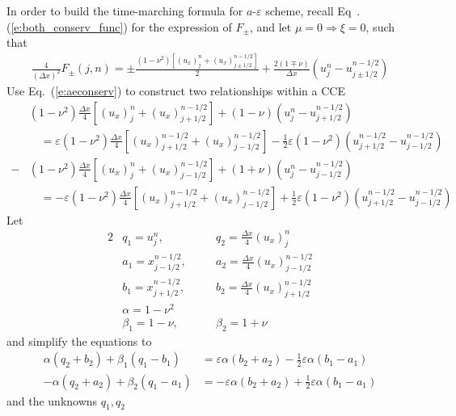 \documentclass{turgon}
\begin{document}
In order to build the time-marching formula for $a$-$\varepsilon$ scheme,
recall Eq~.(\ref{e:both_conserv_func}) for the expression of
$F_{\pm}$, and let $\mu=0\Rightarrow\xi=0$, such that
\begin{align*}
  \frac{4}{(\Delta x)^2}F_{\pm}(j,n)
    = \pm\frac{(1-\nu^2)[(u_x)_j^n+(u_x)_{j\pm1/2}^{n-1/2}]}{2}
    + \frac{2(1\mp\nu)}{\Delta x}(u_j^n-u_{j\pm1/2}^{n-1/2})
\end{align*}
Use Eq.~(\ref{e:aeconserv}) to construct two relationships within a CCE
\begin{align*}
  &(1-\nu^2)\frac{\Delta x}{4}[(u_x)_j^n+(u_x)_{j+1/2}^{n-1/2}]
    + (1-\nu)(u_j^n-u_{j+1/2}^{n-1/2}) \\
  &\quad = \varepsilon(1-\nu^2)\frac{\Delta x}{4}
           [(u_x)_{j+1/2}^{n-1/2}+(u_x)_{j-1/2}^{n-1/2}]
         - \frac{1}{2}
           \varepsilon(1-\nu^2)(u_{j+1/2}^{n-1/2}-u_{j-1/2}^{n-1/2}) \\
 -&(1-\nu^2)\frac{\Delta x}{4}[(u_x)_j^n+(u_x)_{j-1/2}^{n-1/2}]
    + (1+\nu)(u_j^n-u_{j-1/2}^{n-1/2}) \\
  &\quad = -\varepsilon(1-\nu^2)\frac{\Delta x}{4}
            [(u_x)_{j+1/2}^{n-1/2}+(u_x)_{j-1/2}^{n-1/2}]
          + \frac{1}{2}
            \varepsilon(1-\nu^2)(u_{j+1/2}^{n-1/2}-u_{j-1/2}^{n-1/2})
\end{align*}
Let
\begin{alignat*}{2}
  &       q_1 = u_j^n,
  &\quad& q_2 = \frac{\Delta x}{4}(u_x)_j^n \\
  &       a_1 = x_{j-1/2}^{n-1/2},
  &&      a_2 = \frac{\Delta x}{4}(u_x)_{j-1/2}^{n-1/2} \\
  &       b_1 = x_{j+1/2}^{n-1/2},
  &&      b_2 = \frac{\Delta x}{4}(u_x)_{j+1/2}^{n-1/2} \\
  &       \alpha = 1-\nu^2 && \\
  &       \beta_1 = 1-\nu,
  &&      \beta_2 = 1+\nu
\end{alignat*}
and simplify the equations to
\begin{align*}
  \alpha(q_2+b_2) + \beta_1(q_1-b_1)
    &=   \varepsilon\alpha(b_2+a_2)
       - \frac{1}{2}\varepsilon\alpha(b_1-a_1) \\
  -\alpha(q_2+a_2) + \beta_2(q_1-a_1)
    &=  -\varepsilon\alpha(b_2+a_2)
       + \frac{1}{2}\varepsilon\alpha(b_1-a_1)
\end{align*}
and the unknowns $q_1, q_2$
\end{document}
